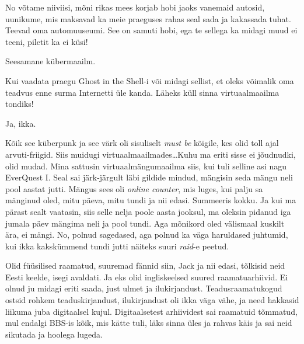 
No võtame niiviisi, mõni rikas mees korjab hobi jaoks vanemaid autosid, 
uunikume, mis maksavad ka meie praeguses rahas seal sada ja kakassada tuhat. 
Teevad oma automuuseumi. See on samuti hobi, ega te sellega ka midagi muud ei 
teeni, piletit ka ei küsi!
       
Seesamane kübermaailm. 

Kui vaadata praegu Ghost in the Shell-i või midagi sellist, et oleks 
võimalik oma teadvus enne surma Internetti üle kanda. Läheks küll sinna 
virtuaalmaailma tondiks!  

Ja, ikka.

                 
Kõik see küberpunk ja see värk oli sisuliselt \emph{must be} kõigile, kes olid 
toll ajal arvuti-friigid. Siis muidugi virtuaalmaailmades\ldots Kuhu ma eriti 
sisse ei jõudnudki, olid mudad. Mina sattusin virtuaalmängumaailma 
siis, kui tuli selline asi nagu EverQuest I. Seal sai 
järk-järgult läbi gildide mindud, mängisin seda mängu neli pool aastat jutti. 
Mängus sees oli \emph{online counter}, mis luges, kui palju sa mänginud oled, 
mitu päeva, mitu tundi ja nii edasi. Summeeris kokku. Ja kui ma pärast sealt 
vaatasin, siis selle nelja poole aasta jooksul, ma oleksin pidanud iga jumala 
päev mängima neli ja pool tundi. Aga mõnikord oled välismaal kuskilt ära, ei 
mängi. No, polnud sagedased, aga polnud ka väga haruldased juhtumid, kui ikka 
kakskümmend tundi jutti näiteks suuri \emph{raid}-e peetud.
                 

Olid füüsilised raamatud, suuremad fännid siin, Jack ja nii edasi, tõlkisid neid Eesti keelde,  isegi 
avaldati. Ja eks olid ingliskeelsed suured raamatuarhiivid. Ei olnud ju midagi 
eriti saada, just ulmet ja ilukirjandust. Teadusraamatukogud  ostsid rohkem 
teaduskirjandust,  ilukirjandust oli ikka väga vähe, ja need hakkasid liikuma 
juba digitaalsel kujul. Digitaalsetest arhiividest sai raamatuid tõmmatud, mul 
endalgi BBS-is kõik, mis kätte tuli, läks sinna üles ja rahvas käis ja sai neid 
sikutada ja hoolega lugeda. 

